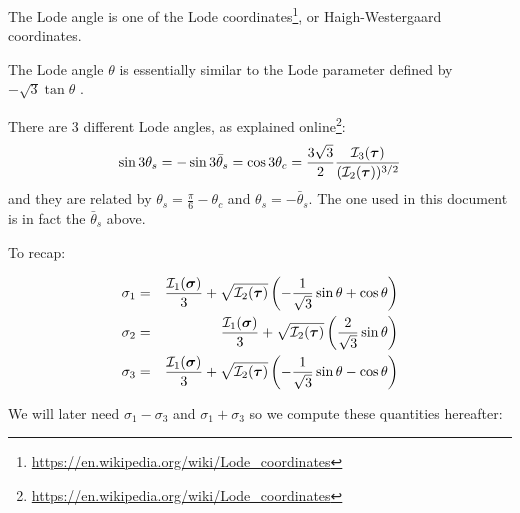 \begin{remark} The Lode angle is one of the Lode 
coordinates\footnote{\url{https://en.wikipedia.org/wiki/Lode_coordinates}},
or Haigh-Westergaard coordinates. 
\end{remark}

\begin{remark} The Lode angle $\theta$ is essentially similar to the 
Lode parameter  defined by $-\sqrt{3}\tan\theta$ \cite{owhi}.
\end{remark}

\begin{remark}
There are 3 different Lode angles, as explained online\footnote{\url{https://en.wikipedia.org/wiki/Lode_coordinates}}:
\[
\sin 3\theta_s = -\sin 3 \bar{\theta}_s = \cos 3\theta_c = \frac{3\sqrt{3}}{2}\frac{{\cal I}_3({\bm \tau})}{({\cal I}_2({\bm \tau}))^{3/2}}
\]
and they are related by $\theta_s = \frac{\pi}{6}-\theta_c$ and $\theta_s = -\bar{\theta}_s$. 
The one used in this document is in fact the $\bar{\theta}_s$ above.
\label{rq:signs}
\end{remark}

To recap:
\begin{mdframed}[backgroundcolor=blue!5]
\begin{eqnarray}
\sigma_1 &=& \frac{{\cal I}_1({\bm \sigma})}{3} + \sqrt{{\cal I}_2({\bm \tau})} \left(-\frac{1}{\sqrt{3}}\sin \theta  +\cos\theta \right) \label{eq:sigma1} \\ 
\sigma_2 &=& \frac{{\cal I}_1({\bm \sigma})}{3} + \sqrt{{\cal I}_2({\bm \tau})} \left(\frac{2}{\sqrt{3}}\sin \theta   \right)    \label{eq:sigma2} \\
\sigma_3 &=& \frac{{\cal I}_1({\bm \sigma})}{3} + \sqrt{{\cal I}_2({\bm \tau})} \left(-\frac{1}{\sqrt{3}}\sin \theta  - \cos \theta \right)    \label{eq:sigma3}
\end{eqnarray}
\end{mdframed}


We will later need $\sigma_1-\sigma_3$ and $\sigma_1+\sigma_3$ so we compute these
quantities hereafter:

